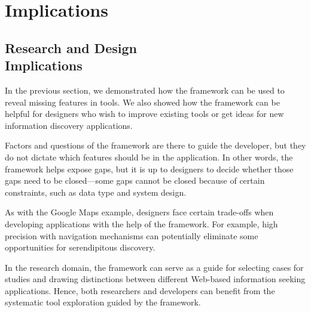 \chapter{Implications}
\label{chapter:implications}

{\section{Research and Design \\ Implications}
In the previous section, we demonstrated how the framework can be used to reveal missing features in tools. We also showed how the framework can be helpful for designers who wish to improve existing tools or get ideas for new information discovery applications. 

Factors and questions of the framework are there to guide the developer, but they do not dictate which features should be in the application. In other words, the framework helps expose gaps, but it is up to designers to decide whether those gaps need to be closed---some gaps cannot be closed because of certain constraints, such as data type and system design.

As with the Google Maps example, designers face certain trade-offs when developing applications with the help of the framework. For example, high precision with navigation mechanisms can potentially eliminate some opportunities for serendipitous discovery. 

In the research domain, the framework can serve as a guide for selecting cases for studies and drawing distinctions between different Web-based information seeking applications. Hence, both researchers and developers can benefit from the systematic tool exploration guided by the framework.

} %